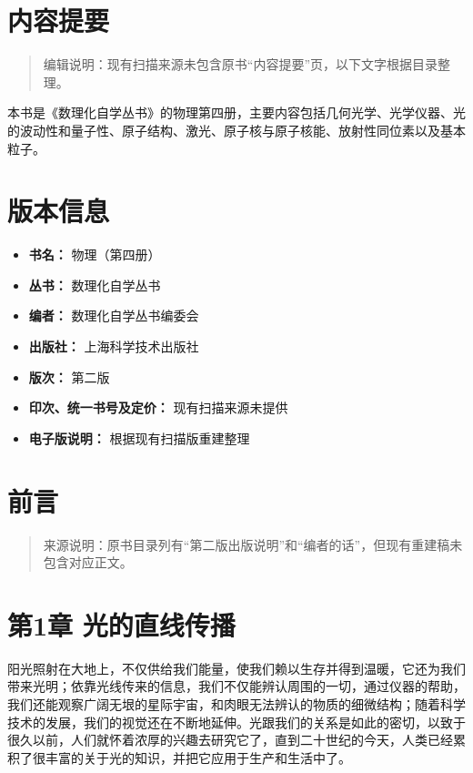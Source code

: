 \chapter*{内容提要}

\begin{quote}
编辑说明：现有扫描来源未包含原书``内容提要''页，以下文字根据目录整理。
\end{quote}

本书是《数理化自学丛书》的物理第四册，主要内容包括几何光学、光学仪器、光的波动性和量子性、原子结构、激光、原子核与原子核能、放射性同位素以及基本粒子。

\chapter*{版本信息}

\begin{itemize}
\item
  \textbf{书名：} 物理（第四册）
\item
  \textbf{丛书：} 数理化自学丛书
\item
  \textbf{编者：} 数理化自学丛书编委会
\item
  \textbf{出版社：} 上海科学技术出版社
\item
  \textbf{版次：} 第二版
\item
  \textbf{印次、统一书号及定价：} 现有扫描来源未提供
\item
  \textbf{电子版说明：} 根据现有扫描版重建整理
\end{itemize}

\chapter{前言}

\begin{quote}
来源说明：原书目录列有``第二版出版说明''和``编者的话''，但现有重建稿未包含对应正文。
\end{quote}

\chapter{第1章
光的直线传播}

阳光照射在大地上，不仅供给我们能量，使我们赖以生存并得到温暖，它还为我们带来光明；依靠光线传来的信息，我们不仅能辨认周围的一切，通过仪器的帮助，我们还能观察广阔无垠的星际宇宙，和肉眼无法辨认的物质的细微结构；随着科学技术的发展，我们的视觉还在不断地延伸。光跟我们的关系是如此的密切，以致于很久以前，人们就怀着浓厚的兴趣去研究它了，直到二十世纪的今天，人类已经累积了很丰富的关于光的知识，并把它应用于生产和生活中了。

